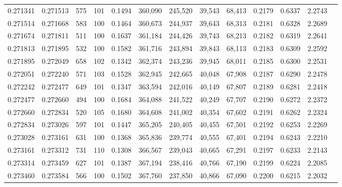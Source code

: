 \begin{tabular}{rrrrrrrrrrrrr}
0.271341 & 0.271513 &   575 & 101 &                                     0.1494 & 360,090 & 245,520 &  39,543 &  68,413 & 0.2179 & 0.6337 & 2.2743 \\
0.271514 & 0.271668 &   583 & 100 &                                     0.1464 & 360,673 & 244,937 &  39,643 &  68,313 & 0.2181 & 0.6328 & 2.2689 \\
0.271674 & 0.271811 &   511 & 100 &                                     0.1637 & 361,184 & 244,426 &  39,743 &  68,213 & 0.2182 & 0.6319 & 2.2641 \\
0.271813 & 0.271895 &   532 & 100 &                                     0.1582 & 361,716 & 243,894 &  39,843 &  68,113 & 0.2183 & 0.6309 & 2.2592 \\
0.271895 & 0.272049 &   658 & 102 &                                     0.1342 & 362,374 & 243,236 &  39,945 &  68,011 & 0.2185 & 0.6300 & 2.2531 \\
0.272051 & 0.272240 &   571 & 103 &                                     0.1528 & 362,945 & 242,665 &  40,048 &  67,908 & 0.2187 & 0.6290 & 2.2478 \\
0.272242 & 0.272477 &   649 & 101 &                                     0.1347 & 363,594 & 242,016 &  40,149 &  67,807 & 0.2189 & 0.6281 & 2.2418 \\
0.272477 & 0.272660 &   494 & 100 &                                     0.1684 & 364,088 & 241,522 &  40,249 &  67,707 & 0.2190 & 0.6272 & 2.2372 \\
0.272660 & 0.272834 &   520 & 105 &                                     0.1680 & 364,608 & 241,002 &  40,354 &  67,602 & 0.2191 & 0.6262 & 2.2324 \\
0.272834 & 0.273026 &   597 & 101 &                                     0.1447 & 365,205 & 240,405 &  40,455 &  67,501 & 0.2192 & 0.6253 & 2.2269 \\
0.273028 & 0.273161 &   631 & 100 &                                     0.1368 & 365,836 & 239,774 &  40,555 &  67,401 & 0.2194 & 0.6243 & 2.2210 \\
0.273161 & 0.273312 &   731 & 110 &                                     0.1308 & 366,567 & 239,043 &  40,665 &  67,291 & 0.2197 & 0.6233 & 2.2143 \\
0.273314 & 0.273459 &   627 & 101 &                                     0.1387 & 367,194 & 238,416 &  40,766 &  67,190 & 0.2199 & 0.6224 & 2.2085 \\
0.273460 & 0.273584 &   566 & 100 &                                     0.1502 & 367,760 & 237,850 &  40,866 &  67,090 & 0.2200 & 0.6215 & 2.2032 \\

\end{tabular}
